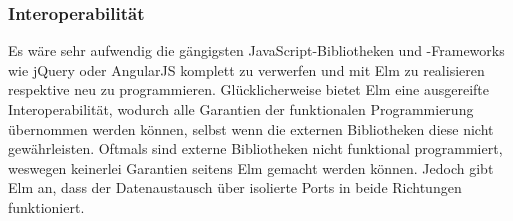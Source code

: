 \subsubsection{Interoperabilität}
\label{sec:Interoperabilität}
Es wäre sehr aufwendig die gängigsten JavaScript-Bibliotheken und -Frameworks wie jQuery oder AngularJS komplett zu verwerfen und mit Elm zu realisieren respektive neu zu programmieren. Glücklicherweise bietet Elm eine ausgereifte Interoperabilität, wodurch alle Garantien der funktionalen Programmierung übernommen werden können, selbst wenn die externen Bibliotheken diese nicht gewährleisten.
Oftmals sind externe Bibliotheken nicht funktional programmiert, weswegen keinerlei Garantien seitens Elm gemacht werden können. Jedoch gibt Elm an, dass der Datenaustausch über isolierte Ports in beide Richtungen funktioniert.




